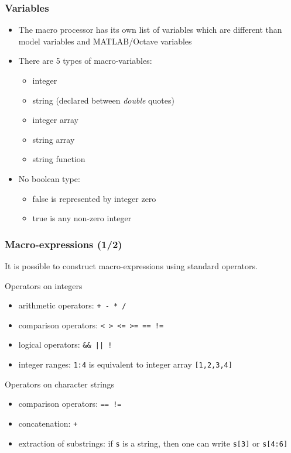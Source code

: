 \documentclass{beamer}
\begin{document}
\begin{frame}
\frametitle{Variables}
\begin{itemize}
\item The macro processor has its own list of variables which are different than model variables and MATLAB/Octave variables
\item There are 5 types of macro-variables:
  \begin{itemize}
  \item integer
  \item string (declared between \textit{double} quotes)
  \item integer array
  \item string array
  \item string function
  \end{itemize}
\item No boolean type:
  \begin{itemize}
  \item false is represented by integer zero
  \item true is any non-zero integer
  \end{itemize}
\end{itemize}
\end{frame}

\begin{frame}[fragile=singleslide]
  \frametitle{Macro-expressions (1/2)}
  It is possible to construct macro-expressions using standard operators.
  \begin{block}{Operators on integers}
    \begin{itemize}
    \item arithmetic operators: \texttt{+ - * /}
    \item comparison operators: \texttt{< > <= >= == !=}
    \item logical operators: \verb+&& || !+
    \item integer ranges: \texttt{1:4} is equivalent to integer array \texttt{[1,2,3,4]}
    \end{itemize}
  \end{block}

  \begin{block}{Operators on character strings}
    \begin{itemize}
    \item comparison operators: \texttt{== !=}
    \item concatenation: \texttt{+}
    \item extraction of substrings: if \texttt{s} is a string, then one can write \texttt{s[3]} or \texttt{s[4:6]}
    \end{itemize}
  \end{block}
\end{frame}
\end{document}
